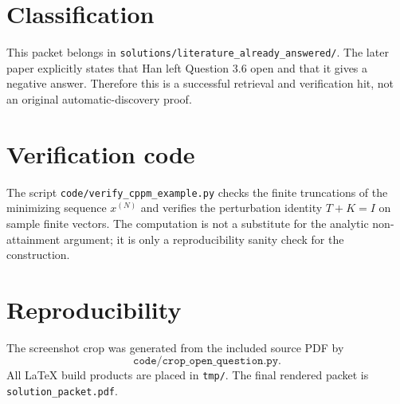 \documentclass[11pt]{article}
\begin{document}
\section*{Classification}

This packet belongs in
\texttt{solutions/literature\_already\_answered/}. The later paper explicitly
states that Han left Question 3.6 open and that it gives a negative answer.
Therefore this is a successful retrieval and verification hit, not an original
automatic-discovery proof.

\section*{Verification code}

The script \texttt{code/verify\_cppm\_example.py} checks the finite truncations
of the minimizing sequence $x^{(N)}$ and verifies the perturbation identity
$T+K=I$ on sample finite vectors. The computation is not a substitute for the
analytic non-attainment argument; it is only a reproducibility sanity check for
the construction.

\section*{Reproducibility}

The screenshot crop was generated from the included source PDF by
\[
\texttt{code/crop\_open\_question.py}.
\]
All LaTeX build products are placed in \texttt{tmp/}. The final rendered packet
is \texttt{solution\_packet.pdf}.
\end{document}
